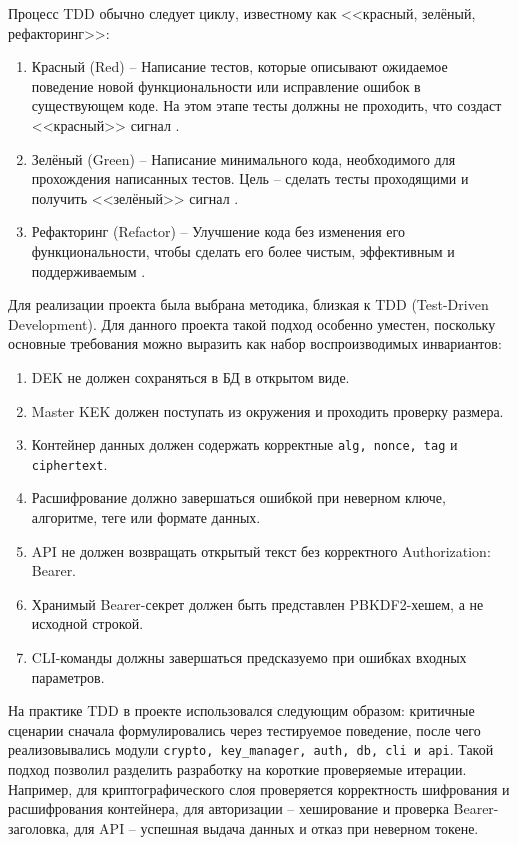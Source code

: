 \documentclass[14pt, a4paper]{extarticle}
\begin{document}
	Процесс TDD обычно следует циклу, известному как <<красный, зелёный,
	рефакторинг>>:
	
	\begin{enumerate}
	\item Красный (Red) -- Написание тестов, которые описывают ожидаемое
	поведение новой функциональности или исправление ошибок в существующем
	коде. На этом этапе тесты должны не проходить, что создаст <<красный>> сигнал \cite{Shadrinsk_TDD}.
	\item Зелёный (Green) -- Написание минимального кода, необходимого
	для прохождения написанных тестов. Цель -- сделать тесты проходящими и
	получить <<зелёный>> сигнал \cite{Shadrinsk_TDD}.
	\item Рефакторинг (Refactor) -- Улучшение кода без изменения его
	функциональности, чтобы сделать его более чистым, эффективным и
	поддерживаемым \cite{Shadrinsk_TDD}.
	\end{enumerate}
		
	Для реализации проекта была выбрана методика, близкая к TDD (Test-Driven Development). Для данного проекта такой подход особенно уместен, поскольку основные требования можно выразить как набор воспроизводимых инвариантов:
	
	\begin{enumerate}
	\item DEK не должен сохраняться в БД в открытом виде.
	\item Master KEK должен поступать из окружения и проходить проверку размера.
	\item Контейнер данных должен содержать корректные \texttt{alg, nonce, tag} и \texttt{ciphertext}.
	\item Расшифрование должно завершаться ошибкой при неверном ключе, алгоритме, теге или формате данных.
	\item API не должен возвращать открытый текст без корректного Authorization: Bearer.
	\item Хранимый Bearer-секрет должен быть представлен PBKDF2-хешем, а не исходной строкой.
	\item CLI-команды должны завершаться предсказуемо при ошибках входных параметров.
	\end{enumerate}
	
	На практике TDD в проекте использовался следующим образом: критичные сценарии сначала формулировались через тестируемое поведение, после чего реализовывались модули \texttt{crypto, key\_manager, auth, db, cli и api}. Такой подход позволил разделить разработку на короткие проверяемые итерации. Например, для криптографического слоя проверяется корректность шифрования и расшифрования контейнера, для авторизации -- хеширование и проверка Bearer-заголовка, для API -- успешная выдача данных и отказ при неверном токене.
	
\end{document}
